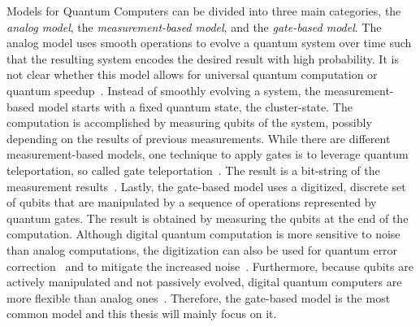 Models for Quantum Computers can be divided into three main categories, the \emph{analog model}, the \emph{measurement-based model}, and the \emph{gate-based model}. The analog model uses smooth operations to evolve a quantum system over time such that the resulting system encodes the desired result with high probability. It is not clear whether this model allows for universal quantum computation or quantum speedup~\cite{DiCh20b}. Instead of smoothly evolving a system, the measurement-based model starts with a fixed quantum state, the cluster-state. The computation is accomplished by measuring qubits of the system, possibly depending on the results of previous measurements. While there are different measurement-based models, one technique to apply gates is to leverage quantum teleportation, so called gate teleportation~\cite{Jozs05}. The result is a bit-string of the measurement results~\cite{DiCh20b, Niel06}. Lastly, the gate-based model uses a digitized, discrete set of qubits that are manipulated by a sequence of operations represented by quantum gates. The result is obtained by measuring the qubits at the end of the computation. Although digital quantum computation is more sensitive to noise than analog computations, the digitization can also be used for quantum error correction~\cite{DMN13} and to mitigate the increased noise~\cite{DiCh20b}. Furthermore, because qubits are actively manipulated and not passively evolved, digital quantum computers are more flexible than analog ones~\cite{RDB*22}. Therefore, the gate-based model is the most common model and this thesis will mainly focus on it. 

